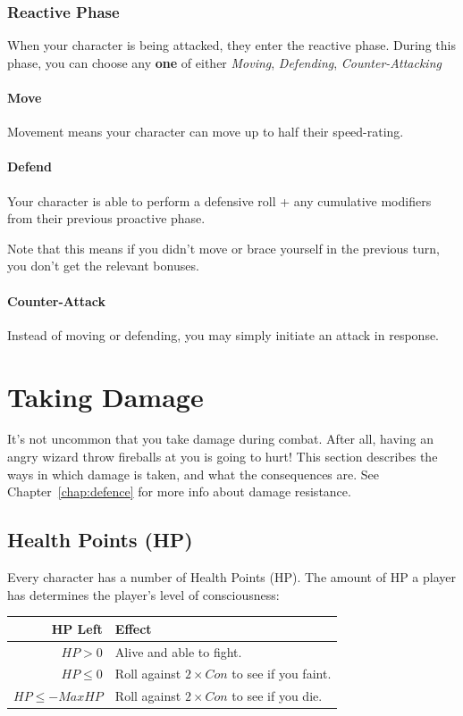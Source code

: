 \subsubsection{Reactive Phase}
When your character is being attacked, they enter the reactive phase.
During this phase, you can choose any \textbf{one} of either \textit{Moving}, \textit{Defending}, \textit{Counter-Attacking}
\paragraph{Move}
Movement means your character can move up to half their speed-rating.
\paragraph{Defend}
Your character is able to perform a defensive roll + any cumulative modifiers from their previous proactive phase.

Note that this means if you didn't move or brace yourself in the previous turn, you don't get the relevant bonuses.
\paragraph{Counter-Attack}
Instead of moving or defending, you may simply initiate an attack in response.

\section{Taking Damage}
It's not uncommon that you take damage during combat.
After all, having an angry wizard throw fireballs at you is going to hurt!
This section describes the ways in which damage is taken, and what the consequences are.
See Chapter~\ref{chap:defence} for more info about damage resistance.

\subsection{Health Points (HP)}\label{sec:health-points}
Every character has a number of Health Points (HP).
The amount of HP a player has determines the player's level of consciousness:

\begin{center}
  \begin{tabular}{r | l}
    \textbf{HP Left} & \textbf{Effect} \\\hline
    $HP > 0$         & Alive and able to fight. \\
    $HP \leq 0$      & Roll against $2 \times Con$ to see if you faint. \\
    $HP \leq -MaxHP$ & Roll against $2 \times Con$ to see if you die.
  \end{tabular}
\end{center}

